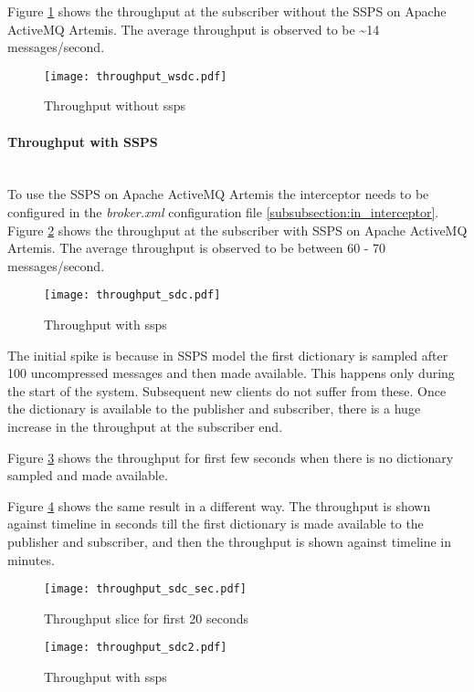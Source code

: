 Figure \ref{figures:throughput_wsdc} shows the throughput at the subscriber without the SSPS on Apache ActiveMQ Artemis. The average throughput is observed to be \textasciitilde14 messages/second.
\makeatletter
\setlength{\@fptop}{0pt}
\setlength{\@fpbot}{0pt}
\setlength{\intextsep}{20pt}
\makeatother

\begin{figure}[h!]
\centering
\texttt{[image: throughput\_wsdc.pdf]}
\caption{Throughput without ssps}\label{figures:throughput_wsdc}
\end{figure}

\paragraph{Throughput with SSPS} \mbox{} \\

To use the SSPS on Apache ActiveMQ Artemis the interceptor needs to be configured in the \textit{broker.xml} configuration file \ref{subsubsection:in_interceptor}. Figure \ref{figures:throughput_sdc} shows the throughput at the subscriber with SSPS on Apache ActiveMQ Artemis. The average throughput is observed to be between 60 - 70 messages/second. 

\begin{figure}[h!]
\centering
\texttt{[image: throughput\_sdc.pdf]}
\caption{Throughput with ssps}\label{figures:throughput_sdc}
\end{figure}

The initial spike is because in SSPS model the first dictionary is sampled after 100 uncompressed messages and then made available. This happens only during the start of the system. Subsequent new clients do not suffer from these. Once the dictionary is available to the publisher and subscriber, there is a huge increase in the throughput at the subscriber end.

Figure \ref{figures:throughput_sdc_sec} shows the throughput for first few seconds when there is no dictionary sampled and made available. 

Figure \ref{figures:throughput_sdc2} shows the same result in a different way. The throughput is shown against timeline in seconds till the first dictionary is made available to the publisher and subscriber, and then the throughput is shown against timeline in minutes.

\begin{figure}[h!]
\centering
\texttt{[image: throughput\_sdc\_sec.pdf]}
\caption{Throughput slice for first 20 seconds}\label{figures:throughput_sdc_sec}
\end{figure}

\begin{figure}[h!]
\centering
\texttt{[image: throughput\_sdc2.pdf]}
\caption{Throughput with ssps}\label{figures:throughput_sdc2}
\end{figure}



